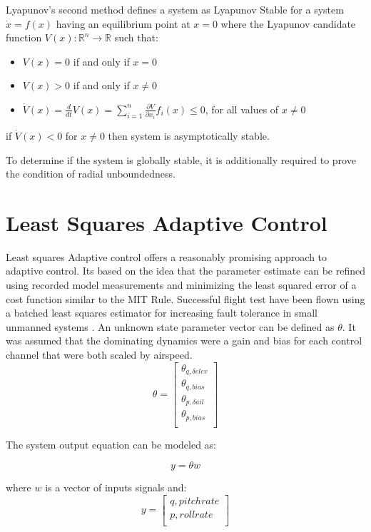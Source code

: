 Lyapunov's second method defines a system as Lyapunov Stable for a system $\dot{x}=f(x)$ having an equilibrium point at $x=0$ where the Lyapunov candidate function $V(x):\mathbb{R}^n \rightarrow \mathbb{R}$ such that:
\begin{itemize}
	\item $V(x)=0$ if and only if $x=0$
	\item $V(x)>0$ if and only if $x\neq0$
	\item $\dot{V}(x)=\frac{d}{dt}V(x)=\sum\limits_{i=1}^{n} \frac{\partial V}{\partial x_i}f_i(x) \leq 0$, for all values of $x\neq 0$		
\end{itemize}

if $\dot{V}(x) < 0$ for $x\neq 0$ then system is asymptotically stable.

To determine if the system is globally stable, it is additionally required to prove the condition of radial unboundedness.

\section{Least Squares Adaptive Control}
Least squares Adaptive control offers a reasonably promising approach to adaptive control.  Its based on the idea that the parameter estimate can be refined using recorded model measurements and minimizing the least squared error of a cost function similar to the MIT Rule.  Successful flight test have been flown using a batched least squares estimator for increasing fault tolerance in small unmanned systems \cite{shore2004flight}.  An unknown state parameter vector can be defined as $\theta$.  It was assumed that the dominating dynamics were a gain and bias for each control channel that were both scaled by airspeed.
\begin{equation}
\theta=  		\begin{bmatrix}
           			\theta _{q,\delta elev} \\  %
           			\theta _{q,bias}  \\
           			\theta _{p,\delta ail} \\ 
           			\theta _{p,bias}  \\
        		 	\end{bmatrix}
\end{equation}

The system output equation can be modeled as:

\begin{equation}
y =  \theta w
\end{equation}

where $w$ is a vector of inputs signals and:
\begin{equation}
y =  		\begin{bmatrix}
			q, pitch rate \\
			p, roll rate \\
        		 \end{bmatrix}
\end{equation}















